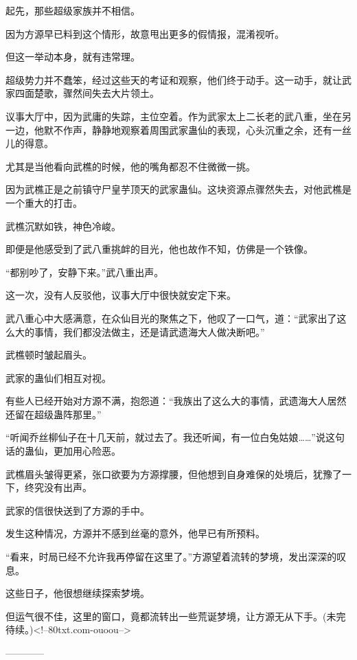 \begin{this_body}
起先，那些超级家族并不相信。

因为方源早已料到这个情形，故意甩出更多的假情报，混淆视听。

但这一举动本身，就有违常理。

超级势力并不蠢笨，经过这些天的考证和观察，他们终于动手。这一动手，就让武家四面楚歌，骤然间失去大片领土。

议事大厅中，因为武庸的失踪，主位空着。作为武家太上二长老的武八重，坐在另一边，他默不作声，静静地观察着周围武家蛊仙的表现，心头沉重之余，还有一丝儿的得意。

尤其是当他看向武樵的时候，他的嘴角都忍不住微微一挑。

因为武樵正是之前镇守尸皇芋顶天的武家蛊仙。这块资源点骤然失去，对他武樵是一个重大的打击。

武樵沉默如铁，神色冷峻。

即便是他感受到了武八重挑衅的目光，他也故作不知，仿佛是一个铁像。

“都别吵了，安静下来。”武八重出声。

这一次，没有人反驳他，议事大厅中很快就安定下来。

武八重心中大感满意，在众仙目光的聚焦之下，他叹了一口气，道：“武家出了这么大的事情，我们都没法做主，还是请武遗海大人做决断吧。”

武樵顿时皱起眉头。

武家的蛊仙们相互对视。

有些人已经开始对方源不满，抱怨道：“我族出了这么大的事情，武遗海大人居然还留在超级蛊阵那里。”

“听闻乔丝柳仙子在十几天前，就过去了。我还听闻，有一位白兔姑娘……”说这句话的蛊仙，更加用心险恶。

武樵眉头皱得更紧，张口欲要为方源撑腰，但他想到自身难保的处境后，犹豫了一下，终究没有出声。

武家的信很快送到了方源的手中。

发生这种情况，方源并不感到丝毫的意外，他早已有所预料。

“看来，时局已经不允许我再停留在这里了。”方源望着流转的梦境，发出深深的叹息。

这些日子，他很想继续探索梦境。

但运气很不佳，这里的窗口，竟都流转出一些荒诞梦境，让方源无从下手。(未完待续。)<!--80txt.com-ouoou-->

------------

\end{this_body}

